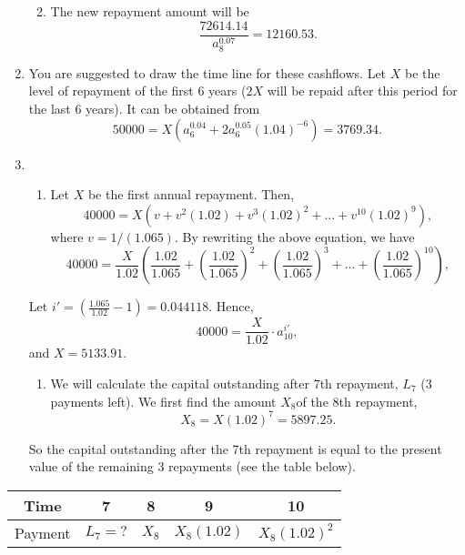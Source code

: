 \documentclass[
]{article}
\providecommand{\tightlist}{%
  \setlength{\itemsep}{0pt}\setlength{\parskip}{0pt}}
\theoremstyle{definition}
\theoremstyle{definition}
\theoremstyle{definition}
\theoremstyle{definition}
\theoremstyle{remark}
\begin{document}
\begin{enumerate}
  \begin{enumerate}
  \def\labelenumii{\arabic{enumii}.}
  \setcounter{enumii}{2}
  \tightlist
  \item
    The new repayment amount will be
    \[\frac{72614.14}{a^{0.07}_{8}} = 12160.53.\]
  \end{enumerate}
\item
  You are suggested to draw the time line for these cashflows. Let \(X\) be the level of repayment of the first 6 years (\(2X\) will be repaid after this period for the last 6 years). It can be obtained from
  \[ 50000 = X(a^{0.04}_6 + 2 a^{0.05}_6 (1.04)^{-6}) = 3769.34.\]
\item
  \begin{enumerate}
  \def\labelenumii{\arabic{enumii}.}
  \tightlist
  \item
    Let \(X\) be the first annual repayment. Then,\\
    \[ 40000 = X(v + v^2(1.02) + v^3(1.02)^2 + \ldots + v^{10}(1.02)^9),\]
    where \(v = 1/(1.065).\) By rewriting the above equation, we have
    \[ 40000 = \frac{X}{1.02}(\frac{1.02}{1.065} + \left( \frac{1.02}{1.065} \right)^2 + \left( \frac{1.02}{1.065} \right)^3 + \ldots + \left( \frac{1.02}{1.065} \right)^{10}),\]
  \end{enumerate}

  Let \(i' = \left( \frac{1.065}{1.02} -1 \right) = 0.044118.\) Hence,
  \[ 40000 = \frac{X}{1.02} \cdot a^{i'}_{10},\]
  and \(X = 5133.91.\)

  \begin{enumerate}
  \def\labelenumii{\arabic{enumii}.}
  \setcounter{enumii}{1}
  \tightlist
  \item
    We will calculate the capital outstanding after 7th repayment, \(L_7\) (3 payments left). We first find the amount \(X_8\)of the 8th repayment,
    \[X_8 = X(1.02)^7 = 5897.25.\]
  \end{enumerate}

  So the capital outstanding after the 7th repayment is equal to the present value of the remaining 3 repayments (see the table below).
\end{enumerate}

\begin{longtable}[]{@{}ccccc@{}}
\toprule
Time & 7 & 8 & 9 & 10 \\
\midrule
\endhead
Payment & \(L_7 = ?\) & \(X_8\) & \(X_8 (1.02)\) & \(X_8(1.02)^2\) \\
\bottomrule
\end{longtable}
\end{document}
